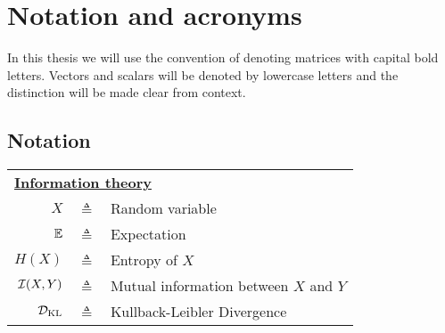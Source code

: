 \chapter*{Notation and acronyms}
In this thesis we will use the convention of denoting matrices with capital bold letters. Vectors and scalars will be denoted by lowercase letters and the distinction will be made clear from context.

\section*{Notation}
\begin{table}[H]%
\begin{center}%
\begin{tabular}{r c p{10cm} }
\toprule
    \multicolumn{3}{l}{\textbf{\underline{Information theory}}} \\
$X$ & $\triangleq$ & Random variable\\
$\mathbb{E}$ & $\triangleq$ & Expectation\\
$H(X)$ & $\triangleq$ & Entropy of $X$\\
${\mathcal{I}}(X,Y)$ & $\triangleq$ & Mutual information between $X$ and $Y$\\
${\mathcal{D}}_{\mathrm{KL}}$ & $\triangleq$ & Kullback-Leibler Divergence \\


\end{tabular}
\end{center}
\end{table}
